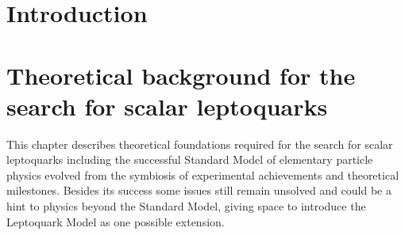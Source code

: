 \chapter{Introduction}
\chapter{Theoretical background for the search for scalar leptoquarks}\label{theory}
This chapter describes theoretical foundations required for the search for scalar leptoquarks including the successful Standard Model of elementary particle physics evolved from the symbiosis of experimental achievements and theoretical milestones. Besides its success some issues still remain unsolved and could be a hint to physics beyond the Standard Model, giving space to introduce the Leptoquark Model as one possible extension. 
